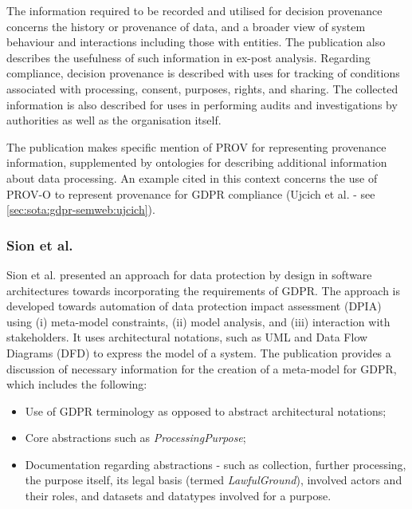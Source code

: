 The information required to be recorded and utilised for decision provenance concerns the history or provenance of data, and a broader view of system behaviour and interactions including those with entities. The publication also describes the usefulness of such information in ex-post analysis.
Regarding compliance, decision provenance is described with uses for tracking of conditions associated with processing, consent, purposes, rights, and sharing.
The collected information is also described for uses in performing audits and investigations by authorities as well as the organisation itself.

The publication makes specific mention of PROV \cite{lebo_prov-o:_2013} for representing provenance information, supplemented by ontologies for describing additional information about data processing.
An example cited in this context concerns the use of PROV-O to represent provenance for GDPR compliance (Ujcich et al. \cite{belhajjame_provenance_2018} - see \autoref{sec:sota:gdpr-semweb:ujcich}).

\subsubsection{Sion et al.}
Sion et al. \cite{sion_architectural_2019} presented an approach for data protection by design in software architectures towards incorporating the requirements of GDPR. The approach is developed towards automation of data protection impact assessment (DPIA) using (i) meta-model constraints, (ii) model analysis, and  (iii) interaction with stakeholders. It uses architectural notations, such as UML and Data Flow Diagrams (DFD) to express the model of a system.  The publication provides a discussion of necessary information for the creation of a meta-model for GDPR, which includes the following:
\begin{itemize}
    \item Use of GDPR terminology as opposed to abstract architectural notations; 
    \item Core abstractions such as \textit{ProcessingPurpose};
    \item Documentation regarding abstractions - such as collection, further processing, the purpose itself, its legal basis (termed \textit{LawfulGround}), involved actors and their roles, and datasets and datatypes involved for a purpose.
\end{itemize}

